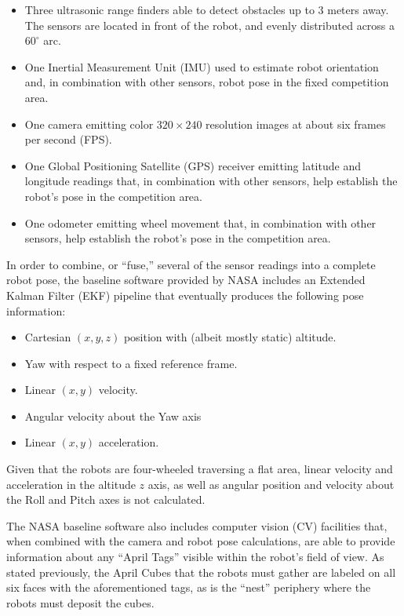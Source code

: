 \documentclass[sigconf,authordraft]{acmart}
\begin{document}
\begin{itemize}
  \item Three ultrasonic range finders able to detect obstacles up to 3 meters
  away. The sensors are located in front of the robot, and evenly distributed
  across a $60^{\circ}$ arc.
  \item One Inertial Measurement Unit (IMU) used to estimate robot orientation
  and, in combination with other sensors, robot pose in the fixed competition
  area.
  \item One camera emitting color $320 \times 240$ resolution images at about
  six frames per second (FPS).
  \item One Global Positioning Satellite (GPS) receiver emitting latitude and
  longitude readings that, in combination with other sensors, help establish the
  robot's pose in the competition area.
  \item One odometer emitting wheel movement that, in combination with other
  sensors, help establish the robot's pose in the competition area.
\end{itemize}

In order to combine, or ``fuse,'' several of the sensor readings into a complete
robot pose, the baseline software provided by NASA includes an Extended Kalman
Filter (EKF) pipeline that eventually produces the following pose information:

\begin{itemize}
  \item Cartesian $(x,y,z)$ position with (albeit mostly static) altitude.
  \item Yaw with respect to a fixed reference frame.
  \item Linear $(x,y)$ velocity.
  \item Angular velocity about the Yaw axis
  \item Linear $(x,y)$ acceleration. 
\end{itemize}

Given that the robots are four-wheeled traversing a flat area, linear velocity
and acceleration in the altitude $z$ axis, as well as angular position and
velocity about the Roll and Pitch axes is not calculated.

The NASA baseline software also includes computer vision (CV) facilities that, when
combined with the camera and robot pose calculations, are able to provide
information about any ``April Tags'' visible within the robot's field of view.
As stated previously, the April Cubes that the robots must gather are
labeled on all six faces with the aforementioned tags, as is the ``nest''
periphery where the robots must deposit the cubes.
\end{document}
